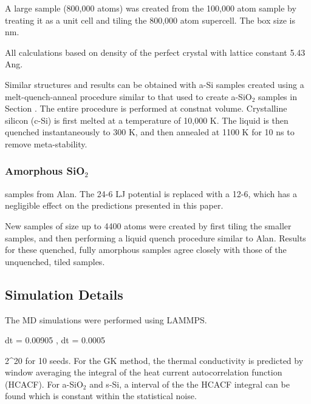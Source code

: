 \documentclass[aps,prb,twocolumn,superscriptaddress,footinbib,amsmath,amssymb,floatfix]{revtex4}
\begin{document}
A large sample (800,000 atoms) was created from the 100,000 atom sample 
by treating it 
as a unit cell and tiling the 800,000 atom supercell. The box size is nm.

All calculations based on density of the perfect crystal with lattice 
constant 5.43 Ang.

Similar structures and results can be obtained with a-Si samples 
created using a melt-quench-anneal procedure similar to that used to 
create a-SiO$_2$ samples in Section . The entire procedure is performed 
at constnat volume. Crystalline silicon (c-Si) is first 
melted at a temperature of 10,000 K. The liquid is then quenched 
instantaneously to 300 K, and then annealed at 1100 K for 10 ns to remove 
meta-stability. 

\subsubsection{\label{S:Sample:SiO2}Amorphous SiO$_2$}

samples from Alan. The 24-6 LJ potential is replaced with a 12-6, 
which has a negligible effect on the predictions presented in this paper. 

New samples of size up to 4400 atoms were created by first tiling the 
smaller samples, and then performing a liquid quench procedure similar to 
Alan. Results for these quenched, fully amorphous samples agree closely
with those of the unquenched, tiled samples. 

\subsection{\label{S:Simulation}Simulation Details}

The MD simulations were performed using LAMMPS.\cite{plimpton_fast_1995} 

dt = 0.00905 , dt = 0.0005

2^20 for 10 seeds. For the GK method, the thermal conductivity is 
predicted by window averaging the integral of the heat current 
autocorrelation function (HCACF). For a-SiO$_2$ and s-Si, a interval 
of the the HCACF integral can be found which is constant within the 
statistical noise. 
\end{document}
